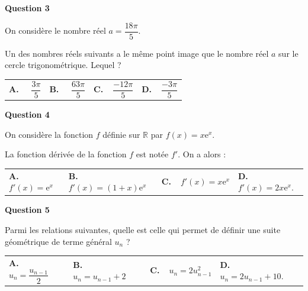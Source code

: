 \documentclass[10pt]{article}
\providecommand{\R}{\mathbb{R}}
\providecommand{\e}{{\mathrm{e}}}
\begin{document}
\medskip

\textbf{Question 3}

\medskip

On considère le nombre réel $a = \dfrac{18\pi}{5}$.


Un des nombres réels suivants a le même point image que le nombre réel $a$ sur le cercle
trigonométrique. Lequel ?

\medskip

\begin{tabularx}{\linewidth}{*{4}{X}}
\textbf{A.~~} $\dfrac{3\pi}{5}$ &\textbf{B.~~} $\dfrac{63\pi}{5}$&\textbf{C.~~}$\dfrac{-12\pi}{5}$& \textbf{D.~~}$\dfrac{-3\pi}{5}$
\end{tabularx}


\medskip

\textbf{Question 4}

\medskip

On considère la fonction $f$ définie sur $\R$ par $f(x) = x\e^x$.

La fonction dérivée de la fonction $f$ est notée $f'$. On a alors :

\medskip

\begin{tabularx}{\linewidth}{*{4}{X}}
\textbf{A.~~} $f'(x) = \e^x$ &\textbf{B.~~} $f'(x) = (1 + x)\e ^x $&\textbf{C.~~}$f'(x) = x\e^x$& \textbf{D.~~} $f'(x) = 2x\e^x$.
\end{tabularx}

\medskip

\textbf{Question 5}

\medskip

Parmi les relations suivantes, quelle est celle qui permet de définir une suite géométrique de
terme général $u_n$ ?

\medskip

\begin{tabularx}{\linewidth}{*{4}{X}}
\textbf{A.~~} $u_n =\dfrac{u_{n-1}}{2}$ &\textbf{B.~~} $u_n = u_{n-1} + 2$&\textbf{C.~~}$ u_ n = 2u_{ n-1}^2$& \textbf{D.~~} $u_n = 2u_{n-1} + 10$.
\end{tabularx}

\vspace{1cm}
\end{document}
